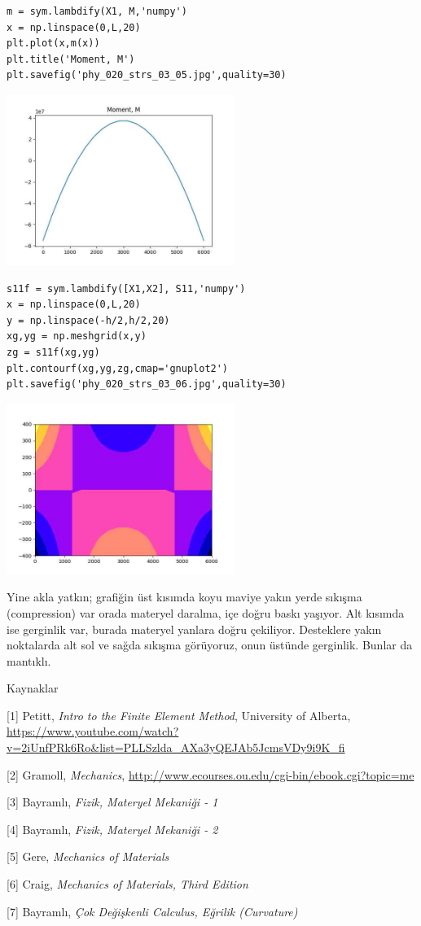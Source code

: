 \documentclass[12pt,fleqn]{article}\usepackage{../../common}
\begin{document}
\begin{verbatim}
m = sym.lambdify(X1, M,'numpy')
x = np.linspace(0,L,20)
plt.plot(x,m(x))
plt.title('Moment, M')
plt.savefig('phy_020_strs_03_05.jpg',quality=30)
\end{verbatim}

\includegraphics[width=20em]{phy_020_strs_03_05.jpg}

\begin{verbatim}
s11f = sym.lambdify([X1,X2], S11,'numpy')
x = np.linspace(0,L,20)
y = np.linspace(-h/2,h/2,20)
xg,yg = np.meshgrid(x,y)
zg = s11f(xg,yg)
plt.contourf(xg,yg,zg,cmap='gnuplot2')
plt.savefig('phy_020_strs_03_06.jpg',quality=30)
\end{verbatim}

\includegraphics[width=20em]{phy_020_strs_03_06.jpg}

Yine akla yatkın; grafiğin üst kısımda koyu maviye yakın yerde sıkışma
(compression) var orada materyel daralma, içe doğru baskı yaşıyor. Alt kısımda
ise gerginlik var, burada materyel yanlara doğru çekiliyor. Desteklere yakın
noktalarda alt sol ve sağda sıkışma görüyoruz, onun üstünde gerginlik.
Bunlar da mantıklı.

Kaynaklar

[1] Petitt, {\em Intro to the Finite Element Method}, University of Alberta,
    \url{https://www.youtube.com/watch?v=2iUnfPRk6Ro&list=PLLSzlda_AXa3yQEJAb5JcmsVDy9i9K_fi}

[2] Gramoll, {\em Mechanics},
    \url{http://www.ecourses.ou.edu/cgi-bin/ebook.cgi?topic=me}

[3] Bayramlı, {\em Fizik, Materyel Mekaniği - 1}
    
[4] Bayramlı, {\em Fizik, Materyel Mekaniği - 2}

[5] Gere, {\em Mechanics of Materials}

[6] Craig, {\em Mechanics of Materials, Third Edition}

[7] Bayramlı, {\em Çok Değişkenli Calculus, Eğrilik (Curvature)}
\end{document}
